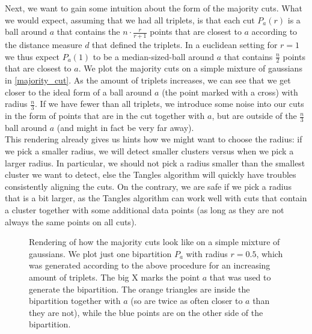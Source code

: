 Next, we want to gain some intuition about the form of the majority cuts. What we would expect, assuming that we had all triplets, is that each cut
$P_a(r)$ is a ball around $a$ that contains the $n \cdot \frac{r}{r+1}$ points that are closest to $a$ according to the distance measure $d$ that defined the triplets. In a euclidean setting for 
$r = 1$ we thus expect $P_a(1)$ to be a median-sized-ball around $a$ that contains $\frac{n}{2}$ points that are closest to $a$. We plot the majority cuts on a simple mixture of gaussians
in \autoref{majority_cut}. As the amount of triplets increases, we can see that we get closer to the ideal form of a ball around $a$ (the point marked with a cross) with radius $\frac{n}{3}$. 
If we have fewer than all triplets, we introduce some noise into our cuts in the form of points that are in the cut together with $a$, but are outside of the $\frac{n}{3}$ ball around $a$
(and might in fact be very far away).\\

This rendering already gives us hints how we might want to choose the radius: if we pick a smaller radius, we will detect smaller clusters versus when we pick a larger radius. 
In particular, we should not pick a radius smaller than the smallest cluster we want to detect, else the Tangles algorithm will quickly have troubles consistently aligning
the cuts. On the contrary, we are safe if we pick a radius that is a bit larger, as the Tangles algorithm can work well with cuts that contain a cluster together with some additional data points 
(as long as they are not always the same points on all cuts).

\onecolumn
\begin{figure}[ht]
    \centering
    \subfloat[500 triplets]{%
      \resizebox{0.5\textwidth}{!}{}
  }
    \subfloat[5000 triplets]{%
      \resizebox{0.5\textwidth}{!}{}}
    \hfill
    \subfloat[20000 triplets]{%
      \resizebox{0.5\textwidth}{!}{}}
    \caption{Rendering of how the majority cuts look like on a simple mixture of gaussians. We plot just one bipartition $P_a$ with radius $r=0.5$, which was generated
        according to the above procedure for an increasing amount of triplets. The big X marks the point $a$
    that was used to generate the bipartition. The orange triangles are inside the bipartition together with $a$ (so are twice as often closer to $a$ than they are not), 
    while the blue points are on the other side of the bipartition.}
    \label{fig:majority_cut}
\end{figure}
